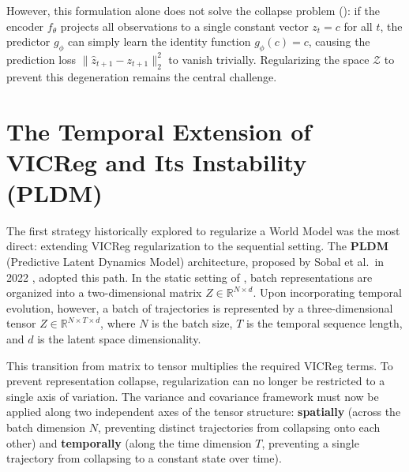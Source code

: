 \documentclass[11pt, oneside, openany]{book}
\begin{document}
However, this formulation alone does not solve the collapse problem (): if the encoder $f_{\theta}$ projects all observations to a single constant vector $z_{t} = c$ for all $t$, the predictor $g_{\phi}$ can simply learn the identity function $g_{\phi}(c) = c$, causing the prediction loss $\lVert \hat{z}_{t+1} - z_{t+1} \rVert_{2}^{2}$ to vanish trivially. Regularizing the space $\mathcal{Z}$ to prevent this degeneration remains the central challenge.

\section{The Temporal Extension of VICReg and Its Instability (PLDM)}
\label{sec:6.2}

The first strategy historically explored to regularize a World Model was the most direct: extending VICReg regularization to the sequential setting. The \textbf{PLDM} (Predictive Latent Dynamics Model) architecture, proposed by Sobal et al.\ in 2022 \cite{sobal2022joint}, adopted this path. In the static setting of , batch representations are organized into a two-dimensional matrix $Z \in \mathbb{R}^{N \times d}$. Upon incorporating temporal evolution, however, a batch of trajectories is represented by a three-dimensional tensor $Z \in \mathbb{R}^{N \times T \times d}$, where $N$ is the batch size, $T$ is the temporal sequence length, and $d$ is the latent space dimensionality.

This transition from matrix to tensor multiplies the required VICReg terms. To prevent representation collapse, regularization can no longer be restricted to a single axis of variation. The variance and covariance framework must now be applied along two independent axes of the tensor structure: \textbf{spatially} (across the batch dimension $N$, preventing distinct trajectories from collapsing onto each other) and \textbf{temporally} (along the time dimension $T$, preventing a single trajectory from collapsing to a constant state over time).
\end{document}
